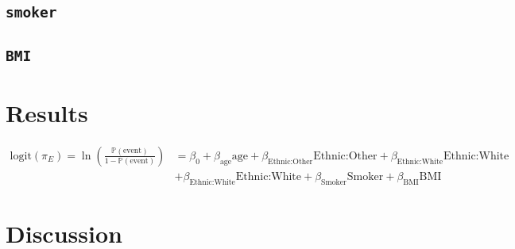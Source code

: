 \documentclass{article}
\begin{document}
\subsection*{\protect\Verb+smoker+}
\subsection*{\protect\Verb+BMI+}

\section*{Results}



\begin{align*}
\text{logit}(\pi_E)=\ln  \left( \frac{\mathbb{P}(\text{event})}{1-\mathbb{P}(\text{event})} \right)&=\beta_0+ \beta_{\text{age}} \text{age}+ \beta_{\text{Ethnic:Other}} \text{Ethnic:Other} +\beta_{\text{Ethnic:White}} \text{Ethnic:White}\\
&+\beta_{\text{Ethnic:White}} \text{Ethnic:White}+\beta_{\text{Smoker}} \text{Smoker} + \beta_{\text{BMI}} \text{BMI}
\end{align*}
\section*{Discussion}
\end{document}
